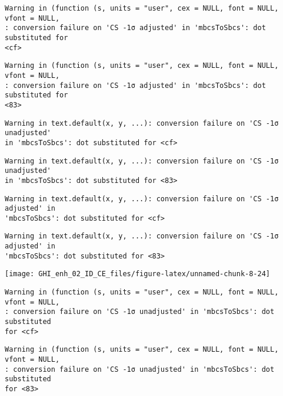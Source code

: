 \documentclass[
  10pt,
  a4paper,oneside]{article}
\begin{document}
\begin{verbatim}
Warning in (function (s, units = "user", cex = NULL, font = NULL, vfont = NULL,
: conversion failure on 'CS -1σ adjusted' in 'mbcsToSbcs': dot substituted for
<cf>
\end{verbatim}

\begin{verbatim}
Warning in (function (s, units = "user", cex = NULL, font = NULL, vfont = NULL,
: conversion failure on 'CS -1σ adjusted' in 'mbcsToSbcs': dot substituted for
<83>
\end{verbatim}

\begin{verbatim}
Warning in text.default(x, y, ...): conversion failure on 'CS -1σ unadjusted'
in 'mbcsToSbcs': dot substituted for <cf>
\end{verbatim}

\begin{verbatim}
Warning in text.default(x, y, ...): conversion failure on 'CS -1σ unadjusted'
in 'mbcsToSbcs': dot substituted for <83>
\end{verbatim}

\begin{verbatim}
Warning in text.default(x, y, ...): conversion failure on 'CS -1σ adjusted' in
'mbcsToSbcs': dot substituted for <cf>
\end{verbatim}

\begin{verbatim}
Warning in text.default(x, y, ...): conversion failure on 'CS -1σ adjusted' in
'mbcsToSbcs': dot substituted for <83>
\end{verbatim}

\begin{center}\texttt{[image: GHI\_enh\_02\_ID\_CE\_files/figure-latex/unnamed-chunk-8-24]} \end{center}

\begin{verbatim}
Warning in (function (s, units = "user", cex = NULL, font = NULL, vfont = NULL,
: conversion failure on 'CS -1σ unadjusted' in 'mbcsToSbcs': dot substituted
for <cf>
\end{verbatim}

\begin{verbatim}
Warning in (function (s, units = "user", cex = NULL, font = NULL, vfont = NULL,
: conversion failure on 'CS -1σ unadjusted' in 'mbcsToSbcs': dot substituted
for <83>
\end{verbatim}
\end{document}
